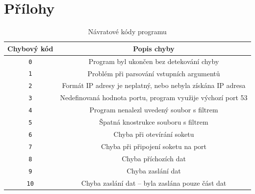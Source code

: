 \documentclass[a4paper, 11pt]{article}
\begin{document}
	\section{Přílohy}
\begin{table}[h]
\centering
\begin{tabular}{cc}
\textbf{Chybový kód} & \textbf{Popis chyby}                                                                                   \\ \hline
\texttt{0}  & Program byl ukončen bez detekování chyby                                                      \\ \hline
\texttt{1}  & Problém při parsování vstupních argumentů                                                     \\ \hline
\texttt{2}  & Formát IP adresy je neplatný, nebo nebyla získána IP adresa\\ \hline
\texttt{3}  & Nedefinovaná hodnota portu, program využije výchozí port 53                                   \\ \hline
\texttt{4} & Program nenalezl uvedený soubor s filtrem                                                     \\ \hline
\texttt{5}  & Špatná knostrukce souboru s filtrem                                                           \\ \hline
\texttt{6}  & Chyba při otevírání soketu                                                                    \\ \hline
\texttt{7}  & Chyba při připojení soketu na port                                                            \\ \hline
\texttt{8}  & Chyba příchozích dat                                                                          \\ \hline
\texttt{9}  & Chyba zaslání dat                                                                             \\ \hline
\texttt{10} & Chyba zaslání dat – byla zaslána pouze část dat                                              
\end{tabular}
\caption{Návratové kódy programu}
\label{tab:1}
\end{table}
\end{document}
